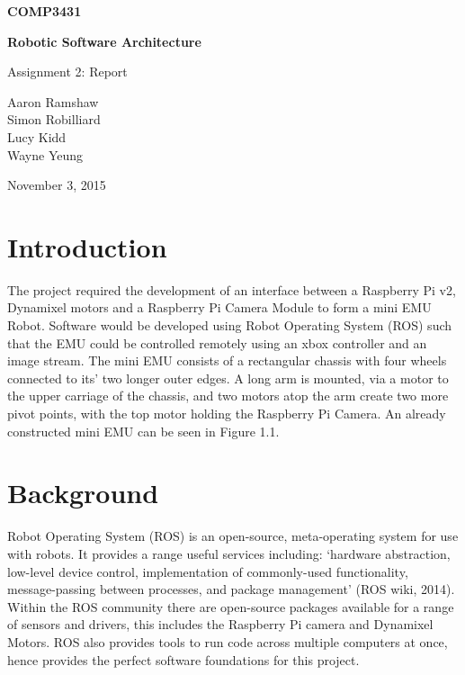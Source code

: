 \documentclass[titlepage,12pt,a4paper]{article}
\begin{document}
\begin{titlepage}
    \begin{center}
        \vspace*{3cm}
        
        \Huge
        \textbf{COMP3431\\}
        \title{}
        \vspace{0.5cm}
        \Huge
        \textbf{Robotic Software Architecture}
        
        \vspace{0.54cm}
        
        \Large
        Assignment 2: Report
        
        \vspace{5cm}

	\normalsize
	Aaron Ramshaw\\
	Simon Robilliard\\
    Lucy Kidd\\
	Wayne Yeung
        
	\vfill
        
        \Large
        November 3, 2015
        
    \end{center}
\end{titlepage}

\pagebreak

\section*{Introduction}
The project required the development of an interface between a Raspberry Pi v2, Dynamixel motors and a Raspberry Pi Camera Module to form a mini EMU Robot. Software would be developed using Robot Operating System (ROS) such that the EMU could be controlled remotely using an xbox controller and an image stream. The mini EMU consists of a rectangular chassis with four wheels connected to its’ two longer outer edges. A long arm is mounted, via a motor to the upper carriage of the chassis, and two motors atop the arm create two more pivot points, with the top motor holding the Raspberry Pi Camera. An already constructed mini EMU can be seen in Figure 1.1.

\section*{Background}
Robot Operating System (ROS) is an open-source, meta-operating system for use with robots. It provides a range useful services including: ‘hardware abstraction, low-level device control, implementation of commonly-used functionality, message-passing between processes, and package management’ (ROS wiki, 2014). Within the ROS community there are open-source packages available for a range of sensors and drivers, this includes the Raspberry Pi camera and Dynamixel Motors. ROS also provides tools to run code across multiple computers at once, hence provides the perfect software foundations for this project.\\
\end{document}
